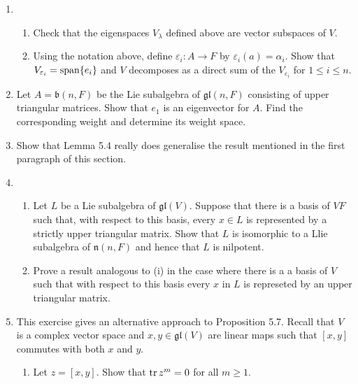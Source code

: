 \documentclass[12pt,a4paper]{report}
\begin{document}
\begin{enumerate}[label=5.\arabic*]

	\item \begin{enumerate}[label=(\roman*)]
	
		\item Check that the eigenspaces $V_\lambda$ defined above are vector subspaces of $V$.
		
		\item Using the notation above, define $\varepsilon_i : A \to F$ by $\varepsilon_i(a)=\alpha_i$.  Show that $V_{\varepsilon_i} = \operatorname{span}\{e_i\}$ and $V$ decomposes as a direct sum of the $V_{\varepsilon_i}$ for $1 \le i \le n$.
	
	\end{enumerate}
	
	\item Let $A = \mathfrak{b}(n, F)$ be the Lie subalgebra of $\mathfrak{gl}(n, F)$ consisting of upper triangular matrices.  Show that $e_1$ is an eigenvector for $A$.  Find the corresponding weight and determine its weight space.
	
	\item Show that Lemma 5.4 really does generalise the result mentioned in the first paragraph of this section.
	
	\item \begin{enumerate}[label=(\roman*)]
		\item Let $L$ be a Lie subalgebra of $\mathfrak{gl}(V)$.  Suppose that there is a basis of $VF$ such that, with respect to this basis, every $x \in L$ is represented by a strictly upper triangular matrix. Show that $L$ is isomorphic to a Llie subalgebra of $\mathfrak{n}(n,F)$ and hence that $L$ is nilpotent.
		
		\item Prove a result analogous to (i) in the case where there is a a basis of $V$ such that with respect to this basis every $x$ in $L$ is represeted by an upper triangular matrix.
	
	\end{enumerate}
	
	\item This exercise gives an alternative approach to Proposition 5.7.  Recall that $V$ is a complex vector space and $x,y \in \mathfrak{gl}(V)$ are linear maps such that $[x,y]$ commutes with both $x$ and $y$.
	\begin{enumerate}[label=(\roman*)]
		\item Let $z=[x,y]$.  Show that $\operatorname{tr} z^m =0$ for all 
	$m \ge 1$.
		

\end{enumerate}
\end{enumerate}
\end{document}

